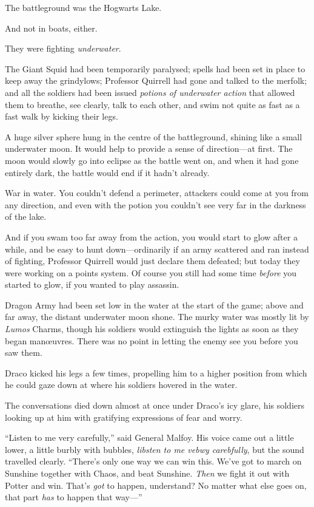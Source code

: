 The battleground was the Hogwarts Lake.

And not in boats, either.

They were fighting \emph{underwater}.

The Giant Squid had been temporarily paralysed; spells had been set in place to keep away the grindylows; Professor Quirrell had gone and talked to the merfolk; and all the soldiers had been issued \emph{potions of underwater action} that allowed them to breathe, see clearly, talk to each other, and swim not quite as fast as a fast walk by kicking their legs.

A huge silver sphere hung in the centre of the battleground, shining like a small underwater moon. It would help to provide a sense of direction—at first. The moon would slowly go into eclipse as the battle went on, and when it had gone entirely dark, the battle would end if it hadn’t already.

War in water. You couldn’t defend a perimeter, attackers could come at you from any direction, and even with the potion you couldn’t see very far in the darkness of the lake.

And if you swam too far away from the action, you would start to glow after a while, and be easy to hunt down—ordinarily if an army scattered and ran instead of fighting, Professor Quirrell would just declare them defeated; but today they were working on a points system. Of course you still had some time \emph{before} you started to glow, if you wanted to play assassin.

Dragon Army had been set low in the water at the start of the game; above and far away, the distant underwater moon shone. The murky water was mostly lit by \emph{Lumos} Charms, though his soldiers would extinguish the lights as soon as they began manœuvres. There was no point in letting the enemy see you before you saw them.

Draco kicked his legs a few times, propelling him to a higher position from which he could gaze down at where his soldiers hovered in the water.

The conversations died down almost at once under Draco’s icy glare, his soldiers looking up at him with gratifying expressions of fear and worry.

“Listen to me very carefully,” said General Malfoy. His voice came out a little lower, a little burbly with bubbles, \emph{libsten to me vebwy carebfully}, but the sound travelled clearly.
“There’s only one way we can win this. We’ve got to march on Sunshine together with Chaos, and beat Sunshine. \emph{Then} we fight it out with Potter and win. That’s \emph{got} to happen, understand? No matter what else goes on, that part \emph{has} to happen that way—”

